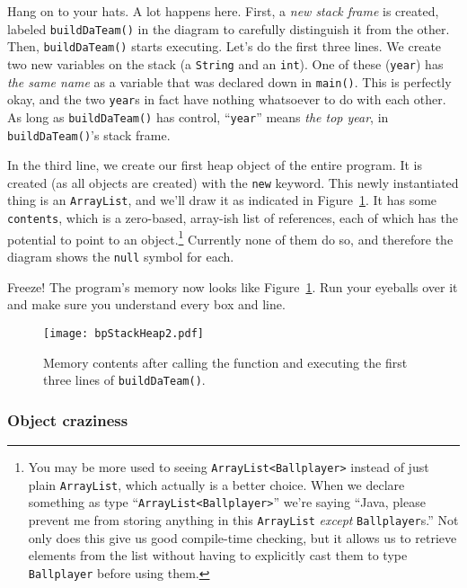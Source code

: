 Hang on to your hats. A lot happens here. First, a \textit{new stack frame} is
created, labeled \texttt{buildDaTeam()} in the diagram to carefully
distinguish it from the other. Then, \texttt{buildDaTeam()} starts executing.
Let's do the first three lines. We create two new variables on the stack
(a \texttt{String} and an \texttt{int}). One of these (\texttt{year}) has
\textit{the same name} as a variable that was declared down in
\texttt{main()}. This is perfectly okay, and the two \texttt{year}s in fact
have nothing whatsoever to do with each other. As long as
\texttt{buildDaTeam()} has control, ``\texttt{year}'' means \textit{the top
year}, in \texttt{buildDaTeam()}'s stack frame.

In the third line, we create our first heap object of the entire program. It
is created (as all objects are created) with the \texttt{new} keyword. This
newly instantiated thing is an \texttt{ArrayList}, and we'll draw it as
indicated in Figure~\ref{fig:bpStackHeap2}. It has some \texttt{contents},
which is a zero-based, array-ish list of references, each of which has the
potential to point to an object.\footnote{You may be more used to seeing
\texttt{ArrayList<Ballplayer>} instead of just plain \texttt{ArrayList}, which
actually is a better choice. When we declare something as type
``\texttt{ArrayList<Ballplayer>}'' we're saying ``Java, please prevent me from
storing anything in this \texttt{ArrayList} \textit{except}
\texttt{Ballplayer}s.'' Not only does this give us good compile-time checking,
but it allows us to retrieve elements from the list without having to
explicitly cast them to type \texttt{Ballplayer} before using them.} Currently
none of them do so, and therefore the diagram shows the \texttt{null} symbol
for each.

Freeze! The program's memory now looks like Figure~\ref{fig:bpStackHeap2}.
Run your eyeballs over it and make sure you understand every box and line.

\begin{figure}[ht]   %
\centering
\texttt{[image: bpStackHeap2.pdf]}
\caption{Memory contents after calling the function and executing the first
three lines of \texttt{buildDaTeam()}.}
\label{fig:bpStackHeap2}
\end{figure}

\subsubsection{Object craziness}

